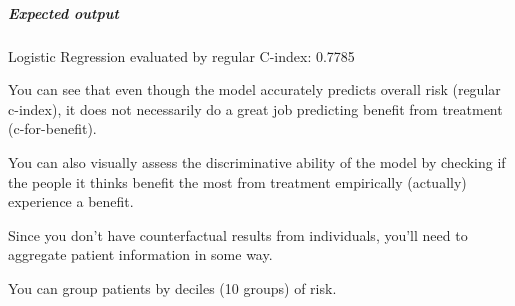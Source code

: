 \documentclass[11pt]{article}
\newenvironment{Shaded}{}{}
\newcommand{\FloatTok}[1]{\textcolor[rgb]{0.25,0.63,0.44}{{#1}}}
\newcommand{\NormalTok}[1]{{#1}}
\begin{document}
    \hypertarget{expected-output}{%
\subparagraph{Expected output}\label{expected-output}}

\begin{Shaded}
\begin{Highlighting}[]
\NormalTok{Logistic Regression evaluated by regular C-index: }\FloatTok{0.7785}
\end{Highlighting}
\end{Shaded}

    You can see that even though the model accurately predicts overall risk
(regular c-index), it does not necessarily do a great job predicting
benefit from treatment (c-for-benefit).

    You can also visually assess the discriminative ability of the model by
checking if the people it thinks benefit the most from treatment
empirically (actually) experience a benefit.

Since you don't have counterfactual results from individuals, you'll
need to aggregate patient information in some way.

You can group patients by deciles (10 groups) of risk.
\end{document}
